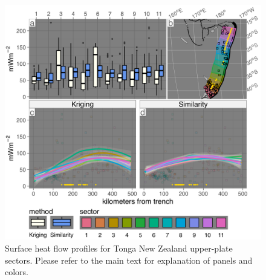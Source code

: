 \begin{figure}[htbp]

{\centering \includegraphics[width=1\linewidth,]{assets/figs/chpt3/TongaNewZealandUpperPlate} 

}

\caption[Surface heat flow profiles for Tonga New Zealand upper-plate sectors]{Surface heat flow profiles for Tonga New Zealand upper-plate sectors. Please refer to the main text for explanation of panels and colors.}\label{fig:tongaNewZealandUpper}
\end{figure}

